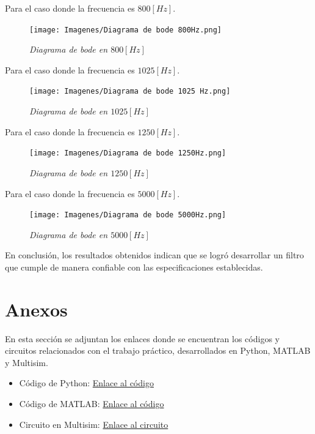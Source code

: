\documentclass[12pt,A4paper,titlepage]{article}
\begin{document}
\hspace{1mm} Para el caso donde la frecuencia es \(800 [Hz]\).

\begin{figure}[!h] 
  \centering
  \texttt{[image: Imagenes/Diagrama de bode 800Hz.png]}
  \caption{\textit{Diagrama de bode en \(800 [Hz]\)}}
\end{figure}

\newpage
\hspace{1mm} Para el caso donde la frecuencia es \(1025 [Hz]\).

\begin{figure}[!h] 
  \centering
  \texttt{[image: Imagenes/Diagrama de bode 1025 Hz.png]}
  \caption{\textit{Diagrama de bode en \(1025 [Hz]\)}}
\end{figure}

\hspace{1mm} Para el caso donde la frecuencia es \(1250 [Hz]\).

\begin{figure}[!h] 
  \centering
  \texttt{[image: Imagenes/Diagrama de bode 1250Hz.png]}
  \caption{\textit{Diagrama de bode en \(1250 [Hz]\)}}
\end{figure}

\newpage
\hspace{1mm} Para el caso donde la frecuencia es \(5000 [Hz]\).

\begin{figure}[!h] 
  \centering
  \texttt{[image: Imagenes/Diagrama de bode 5000Hz.png]}
  \caption{\textit{Diagrama de bode en \(5000 [Hz]\)}}
\end{figure}

\bigskip
\hspace{1mm} En conclusión, los resultados obtenidos indican que se logró desarrollar un filtro que cumple de manera confiable con las especificaciones establecidas.

\newpage
\section{Anexos}
\hspace{1mm} En esta sección se adjuntan los enlaces donde se encuentran los códigos y circuitos relacionados con el trabajo práctico, desarrollados en Python, MATLAB y Multisim.

\begin{itemize}
  \item Código de Python: \href{https://drive.google.com/drive/u/1/folders/1fn2AohxBO8u0CoIdvzcblCPVYjSHX1o6}{Enlace al código}
  \item Código de MATLAB: \href{https://drive.google.com/drive/u/1/folders/1jXmiKLY8pMCHEQzc57ifM0zqxy9C7B6I}{Enlace al código}
  \item Circuito en Multisim: \href{https://drive.google.com/drive/u/1/folders/1w0o-CqxwTwL3AFiesvhs8fyIltAos4nD}{Enlace al circuito}
\end{itemize}
\end{document}
